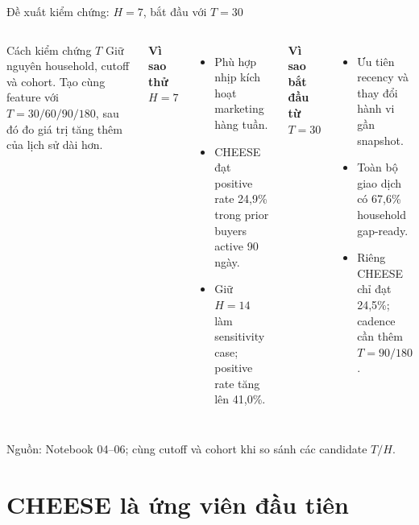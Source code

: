 \documentclass[aspectratio=169,11pt]{beamer}
\newcommand{\src}[1]{\par\vfill{\tiny\color{gray}Nguồn: #1}}
\begin{document}
\begin{frame}{Đề xuất kiểm chứng: $H=7$, bắt đầu với $T=30$}
\begin{columns}[T]
\centering
{}
\vspace{.45cm}
\begin{block}{Cách kiểm chứng $T$}
\small
Giữ nguyên household, cutoff và cohort. Tạo cùng feature với
$T=30/60/90/180$, sau đó đo giá trị tăng thêm của lịch sử dài hơn.
\end{block}
\small
\textbf{Vì sao thử $H=7$}
\begin{itemize}\setlength\itemsep{2pt}
\item Phù hợp nhịp kích hoạt marketing hàng tuần.
\item CHEESE đạt positive rate 24,9\% trong prior buyers active 90 ngày.
\item Giữ $H=14$ làm sensitivity case; positive rate tăng lên 41,0\%.
\end{itemize}
\textbf{Vì sao bắt đầu từ $T=30$}
\begin{itemize}\setlength\itemsep{2pt}
\item Ưu tiên recency và thay đổi hành vi gần snapshot.
\item Toàn bộ giao dịch có 67,6\% household gap-ready.
\item Riêng CHEESE chỉ đạt 24,5\%; cadence cần thêm $T=90/180$.
\end{itemize}
\end{columns}
\src{Notebook 04--06; cùng cutoff và cohort khi so sánh các candidate $T/H$.}
\end{frame}

\section{CHEESE là ứng viên đầu tiên}
\end{document}
